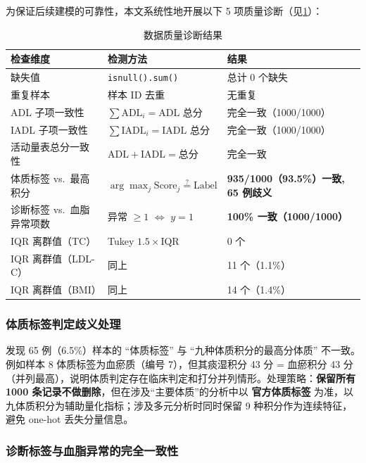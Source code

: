 \documentclass{MathorCupmodeling}
\begin{document}
为保证后续建模的可靠性，本文系统性地开展以下 5 项质量诊断（见\cref{tab:quality}）：

\begin{table}[H]
\centering\small
\caption{数据质量诊断结果}\label{tab:quality}
\begin{tabular}{@{}l l l@{}}
\toprule
检查维度 & 检测方法 & 结果 \\
\midrule
缺失值 & \texttt{isnull().sum()} & 总计 0 个缺失 \\
重复样本 & 样本 ID 去重 & 无重复 \\
ADL 子项一致性 & $\sum \text{ADL}_i = \text{ADL 总分}$ & 完全一致（1000/1000） \\
IADL 子项一致性 & $\sum \text{IADL}_i = \text{IADL 总分}$ & 完全一致（1000/1000） \\
活动量表总分一致性 & $\text{ADL}+\text{IADL} = \text{总分}$ & 完全一致 \\
体质标签 vs.~最高积分 & $\arg\max_{j} \text{Score}_j \stackrel{?}{=} \text{Label}$ & \textbf{935/1000（93.5\%）一致, 65 例歧义} \\
诊断标签 vs.~血脂异常项数 & 异常 $\ge 1$ $\Leftrightarrow$ $y=1$ & \textbf{100\% 一致（1000/1000）} \\
IQR 离群值（TC） & Tukey $1.5\times$IQR & 0 个 \\
IQR 离群值（LDL-C） & 同上 & 11 个（1.1\%） \\
IQR 离群值（BMI） & 同上 & 14 个（1.4\%） \\
\bottomrule
\end{tabular}
\end{table}

\subsubsection{体质标签判定歧义处理}

发现 65 例（6.5\%）样本的 ``体质标签'' 与 ``九种体质积分的最高分体质'' 不一致。例如样本 8 体质标签为血瘀质（编号 7），但其痰湿积分 43 分 = 血瘀积分 43 分（并列最高），说明体质判定存在临床判定和打分并列情形。处理策略：\textbf{保留所有 1000 条记录不做删除}，但在涉及``主要体质''的分析中以 \textbf{官方体质标签} 为准，以九体质积分为辅助量化指标；涉及多元分析时同时保留 9 种积分作为连续特征，避免 one-hot 丢失分量信息。

\subsubsection{诊断标签与血脂异常的完全一致性}
\end{document}
